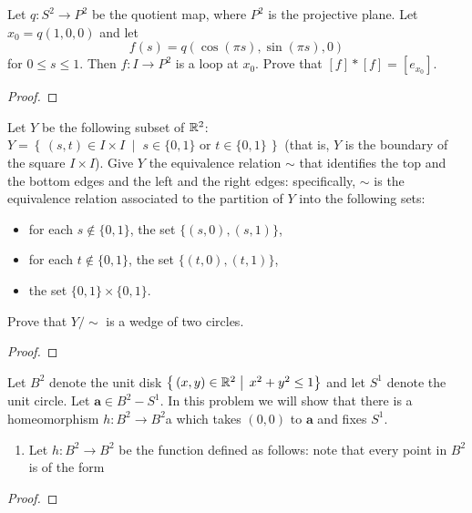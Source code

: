 \newpage
\begin{problem}[B]
Let $q\colon S^2\to P^2$ be the quotient map, where $P^2$ is the
projective plane. Let $x_0=q(1,0,0)$ and let
\[f(s)=q(\cos(\pi s),\sin(\pi s),0)\]
for $0\leq s\leq 1$. Then $f\colon I\to P^2$ is a loop at
$x_0$. Prove that $[f]*[f]=[e_{x_0}]$.
\end{problem}
\begin{proof}
\end{proof}
\newpage
\begin{problem}[C]
Let $Y$ be the following subset of $\mathbb{R}^2$: $Y=\left\{\,(s,t)\in
  I\times I\;\middle|\;\text{$s\in\{0,1\}$ or
    $t\in\{0,1\}$}\,\right\}$ (that is, $Y$ is the boundary of
the square $I\times I$). Give $Y$ the equivalence relation $\sim$
that identifies the top and the bottom edges and the left and the
right edges: specifically, $\sim$ is the equivalence relation
associated to the partition of $Y$ into the following sets:
\begin{itemize}
\item for each $s\notin\{0,1\}$, the set $\{(s,0),(s,1)\}$,
\item for each $t\notin\{0,1\}$, the set $\{(t,0),(t,1)\}$,
\item the set $\{0,1\}\times\{0,1\}$.
\end{itemize}
Prove that $Y/\sim$ is a wedge of two circles.
\end{problem}
\begin{proof}
\end{proof}
\newpage
\begin{problem}
Let $B^2$ denote the unit disk
$\left\{\,(x,y)\in\mathbb{R}^2\;\middle|\;\,x^2+y^2\leq 1\right\}$ and
let $S^1$ denote the unit circle. Let $\mathbf{a}\in B^2-S^1$. In
this problem we will show that there is a homeomorphism $h\colon
B^2\to B^2$a which takes $(0,0)$ to $\mathbf{a}$ and fixes $S^1$.
\begin{enumerate}[label=(\roman*)]
\item Let $h\colon B^2\to B^2$ be the function defined as
  follows: note that every point in $B^2$ is of the form
\end{enumerate}
\end{problem}
\begin{proof}
\end{proof}

